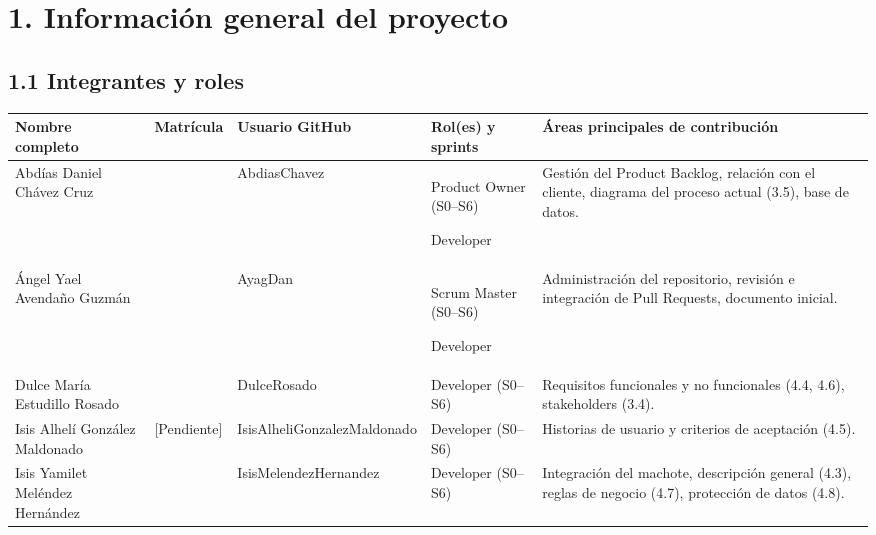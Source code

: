 \section{1. Información general del
proyecto}\label{informaciuxf3n-general-del-proyecto}

\subsection{1.1 Integrantes y roles}\label{integrantes-y-roles}

{\def\LTcaptype{none} %
\begin{longtable}[]{@{}
  >{\raggedright\arraybackslash}p{}
  >{\raggedright\arraybackslash}p{}
  >{\raggedright\arraybackslash}p{}
  >{\raggedright\arraybackslash}p{}
  >{\raggedright\arraybackslash}p{}@{}}
\toprule\noalign{}
\begin{minipage}[b]{\linewidth}\raggedright
\textbf{Nombre completo}
\end{minipage} & \begin{minipage}[b]{\linewidth}\raggedright
\textbf{Matrícula}
\end{minipage} & \begin{minipage}[b]{\linewidth}\raggedright
\textbf{Usuario GitHub}
\end{minipage} & \begin{minipage}[b]{\linewidth}\raggedright
\textbf{Rol(es) y sprints}
\end{minipage} & \begin{minipage}[b]{\linewidth}\raggedright
\textbf{Áreas principales de contribución}
\end{minipage} \\
\midrule\noalign{}
\endhead
\bottomrule\noalign{}
\endlastfoot
Abdías Daniel Chávez Cruz & 0224170024 & AbdiasChavez & Product Owner
(S0--S6)

Developer & Gestión del Product Backlog, relación con el cliente,
diagrama del proceso actual (3.5), base de datos. \\
Ángel Yael Avendaño Guzmán & 0224170023 & AyagDan & Scrum Master
(S0--S6)

Developer & Administración del repositorio, revisión e integración de
Pull Requests, documento inicial. \\
Dulce María Estudillo Rosado & 0224170028 & DulceRosado & Developer
(S0--S6) & Requisitos funcionales y no funcionales (4.4, 4.6),
stakeholders (3.4). \\
Isis Alhelí González Maldonado & {[}Pendiente{]} &
IsisAlheliGonzalezMaldonado & Developer (S0--S6) & Historias de usuario
y criterios de aceptación (4.5). \\
Isis Yamilet Meléndez Hernández & 0224170037 & IsisMelendezHernandez &
Developer (S0--S6) & Integración del machote, descripción general (4.3),
reglas de negocio (4.7), protección de datos (4.8). \\
\end{longtable}
}

